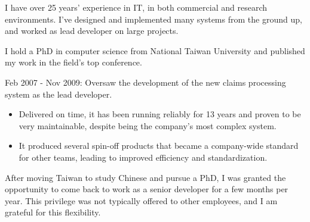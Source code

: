 \documentclass[10pt,a4paper]{altacv}
\begin{document}

\begin{fullwidth}
\makecvheader

I have over 25 years' experience in IT, in both commercial and research environments. I've designed and implemented many systems from the ground up, and worked as lead developer on large projects.

I hold a PhD in computer science from National Taiwan University and published my work in the field's top conference.

\end{fullwidth}



Feb 2007 - Nov 2009: Oversaw the development of the new claims processing system as the lead developer.
\begin{itemize}
	\item\small{Delivered on time, it has been running reliably for 13 years and proven to be very maintainable, despite being the company's most complex system.}
	\item\small{It produced several spin-off products that became a company-wide standard for other teams, leading to improved efficiency and standardization.}
\end{itemize}

\medskip

After moving Taiwan to study Chinese and pursue a PhD, I was granted the opportunity to come back to work as a senior developer for a few months per year. This privilege was not typically offered to other employees, and I am grateful for this flexibility.
\end{document}
